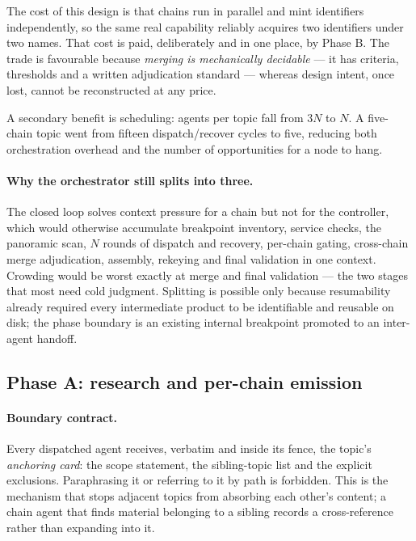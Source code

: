 \documentclass[10pt,a4paper]{article}
\begin{document}
The cost of this design is that chains run in parallel and mint identifiers
independently, so the same real capability reliably acquires two identifiers
under two names. That cost is paid, deliberately and in one place, by Phase B.
The trade is favourable because \emph{merging is mechanically decidable} --- it
has criteria, thresholds and a written adjudication standard --- whereas design
intent, once lost, cannot be reconstructed at any price.

A secondary benefit is scheduling: agents per topic fall from $3N$ to $N$. A
five-chain topic went from fifteen dispatch/recover cycles to five, reducing both
orchestration overhead and the number of opportunities for a node to hang.

\paragraph{Why the orchestrator still splits into three.} The closed loop solves
context pressure for a chain but not for the controller, which would otherwise
accumulate breakpoint inventory, service checks, the panoramic scan, $N$ rounds
of dispatch and recovery, per-chain gating, cross-chain merge adjudication,
assembly, rekeying and final validation in one context. Crowding would be worst
exactly at merge and final validation --- the two stages that most need cold
judgment. Splitting is possible only because resumability already required every
intermediate product to be identifiable and reusable on disk; the phase boundary
is an existing internal breakpoint promoted to an inter-agent handoff.

\subsection{Phase A: research and per-chain emission}
\label{sec:phaseA}

\paragraph{Boundary contract.} Every dispatched agent receives, verbatim and
inside its fence, the topic's \emph{anchoring card}: the scope statement, the
sibling-topic list and the explicit exclusions. Paraphrasing it or referring to
it by path is forbidden. This is the mechanism that stops adjacent topics from
absorbing each other's content; a chain agent that finds material belonging to a
sibling records a cross-reference rather than expanding into it.
\end{document}
